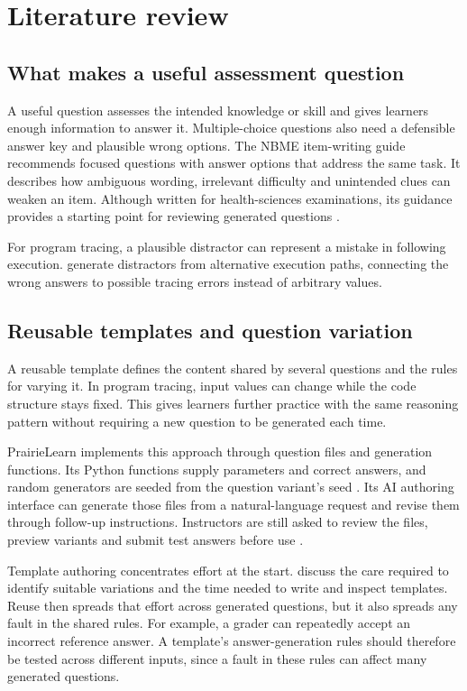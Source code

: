 \section{Literature review}\label{sec:literature}

\subsection{What makes a useful assessment question}\label{sec:literature-2-1}

A useful question assesses the intended knowledge or skill and gives learners enough information to answer it. Multiple-choice questions also need a defensible answer key and plausible wrong options. The NBME item-writing guide recommends focused questions with answer options that address the same task. It describes how ambiguous wording, irrelevant difficulty and unintended clues can weaken an item. Although written for health-sciences examinations, its guidance provides a starting point for reviewing generated questions \parencite{nbme2024}.

For program tracing, a plausible distractor can represent a mistake in following execution. \textcite{thomas2019} generate distractors from alternative execution paths, connecting the wrong answers to possible tracing errors instead of arbitrary values.

\subsection{Reusable templates and question variation}\label{sec:literature-2-2}

A reusable template defines the content shared by several questions and the rules for varying it. In program tracing, input values can change while the code structure stays fixed. This gives learners further practice with the same reasoning pattern without requiring a new question to be generated each time.

PrairieLearn implements this approach through question files and generation functions. Its Python functions supply parameters and correct answers, and random generators are seeded from the question variant's seed \parencite{prairie-server}. Its AI authoring interface can generate those files from a natural-language request and revise them through follow-up instructions. Instructors are still asked to review the files, preview variants and submit test answers before use \parencite{prairie-ai}.

Template authoring concentrates effort at the start. \textcite{thomas2019} discuss the care required to identify suitable variations and the time needed to write and inspect templates. Reuse then spreads that effort across generated questions, but it also spreads any fault in the shared rules. For example, a grader can repeatedly accept an incorrect reference answer. A template’s answer-generation rules should therefore be tested across different inputs, since a fault in these rules can affect many generated questions.

